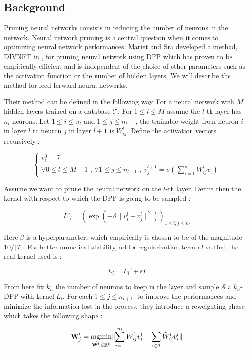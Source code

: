 \subsection{Background}

 Pruning neural networks consists in reducing the number of neurons in the network. Neural network pruning is a central question when it comes to optimizing neural network performances. Mariet and Sra developed a method, DIVNET in \cite{mariet_diversity_2017}, for  pruning neural network using DPP which has proven to be empirically efficient and is independent of the choice of other parameters such as the activation function or the number of hidden layers. We will describe the method for feed forward neural networks.

Their method can be defined in the following way. For a neural network with $M$ hidden layers trained on a database $\mathcal{T}$. For $1 \leq l \leq M$ assume the $l$-th layer has $n_l$ neurons. Let $1\leq i \leq n_l$ and $1 \leq j \leq n_{l+1}  $, the trainable weight from neuron $i$ in layer $l$ to neuron $j$ in layer $l+1$ is $W_{ij}^l$.  Define the activation vectors recursively :

\[
\begin{cases}
    v_1^0 = \mathcal{T} \\
    \forall 0 \leq l \leq M-1 \text{ , } \forall 1 \leq j \leq n_{l+1} \text{ , } v_j^{l+1} = \sigma ( \sum \limits_{i=1}^{n_l} W_{ij}^l v_i^l)
\end{cases}
\]


Assume  we want to prune the neural network on the $l$-th layer. Define then the kernel with respect to which the DPP is going to be sampled : 

\[ L'_l = ( \exp(-\beta \lVert v_i^l-v_j^l \rVert ^2))_{1\leq  i,j \leq n_l} \]

Here $\beta$ is a hyperparameter, which empirically is chosen to be of the magnitude $10/\lvert \mathcal{T} \rvert$. For better numerical stability, add a regularization term $\epsilon I$ so that the real kernel used is :

$$L_l = L_l' + \epsilon I $$ 

From here fix $k_n$ the number of neurons to keep in the layer and sample $\mathcal{S}$ a $k_n$-DPP with kernel $L_l$. For each $1 \leq j \leq n_{l+1}$, to improve the performances and minimize the information lost in the process, they introduce a reweighting phase which takes the following shape : 

\begin{equation} \label{eqn:reweighting}
\Tilde{\mathbf{W}_j^l} = \underset{\Tilde{\mathbf{W}_j^l} \in \mathbb{R}^{k}}{\operatorname{argmin}} \lVert \sum \limits_{i =1}^{n_l} W_{ij}^l v_i^l - \sum \limits_{i \in \mathcal{S}} \Tilde{W}_{ij}^l v_i^l \rVert 
\end{equation}

